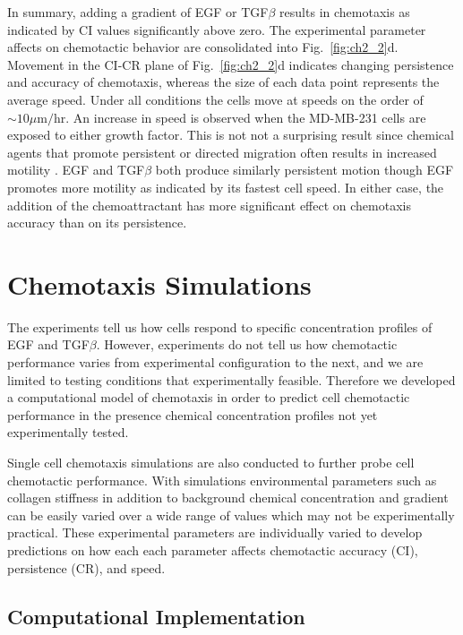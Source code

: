 In summary, adding a gradient of EGF or TGF$\beta$ results in chemotaxis as indicated by CI values significantly above zero. The experimental parameter affects on chemotactic behavior are consolidated into Fig.\ \ref{fig:ch2_2}d. Movement in the CI-CR plane of Fig.\ \ref{fig:ch2_2}d indicates changing persistence and accuracy of chemotaxis, whereas the size of each data point represents the average speed. Under all conditions the cells move at speeds on the order of $\sim 10 \mu\text{m}/\text{hr}$. An increase in speed is observed when the MD-MB-231 cells are exposed to either growth factor. This is not not a surprising result since chemical agents that promote persistent or directed migration often results in increased motility \cite{petrie2009random}. EGF and TGF$\beta$ both produce similarly persistent motion though EGF promotes more motility as indicated by its fastest cell speed. In either case, the addition of the chemoattractant has more significant effect on chemotaxis accuracy than on its persistence.


\section{Chemotaxis Simulations}

The experiments tell us how cells respond to specific concentration profiles of EGF and TGF$\beta$. However, experiments do not tell us how chemotactic performance varies from experimental configuration to the next, and we are limited to testing conditions that experimentally feasible. Therefore we developed a computational model of chemotaxis in order to predict cell chemotactic performance in the presence chemical concentration profiles not yet experimentally tested.

Single cell chemotaxis simulations are also conducted to further probe cell chemotactic performance. With simulations environmental parameters such as collagen stiffness in addition to background chemical concentration and gradient can be easily varied over a wide range of values which may not be experimentally practical. These experimental parameters are individually varied to develop predictions on how each each parameter affects chemotactic accuracy (CI), persistence (CR), and speed.


\subsection{Computational Implementation}

